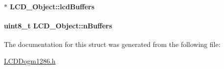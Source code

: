 \paragraph[{lcd\-Buffers}]{$\ast$ L\-C\-D\-\_\-\-Object\-::lcd\-Buffers}\label{struct_l_c_d___object_acf7322679a62a6a8f0d0c26363d33696}
\paragraph[{n\-Buffers}]{\setlength{\rightskip}{0pt plus 5cm}uint8\-\_\-t L\-C\-D\-\_\-\-Object\-::n\-Buffers}\label{struct_l_c_d___object_aaedc411a324d3ada993422793871a919}


The documentation for this struct was generated from the following file\-:\begin{DoxyCompactItemize}
\item 
\hyperlink{_l_c_d_dogm1286_8h}{L\-C\-D\-Dogm1286.\-h}\end{DoxyCompactItemize}
